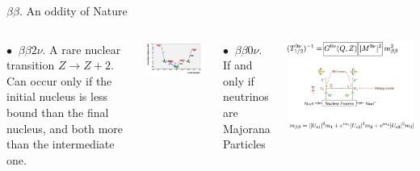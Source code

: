 \documentclass [aspectratio=169]{beamer}
\begin{document}
\begin{frame}{$\beta\beta$. An oddity of Nature}

\begin{columns}

%

$\bullet~$   $\beta\beta2\nu$. A rare nuclear transition $Z \rightarrow Z + 2$. Can occur only if the initial nucleus is less bound than the final nucleus, and both more than the intermediate one.

\includegraphics[scale=0.40]{xebb2nu.png}


$\bullet~$   $\beta\beta0\nu$. If and only if neutrinos are Majorana Particles

 \includegraphics[scale=0.22]{bb0nu.png}
%
%
 
\end{columns}
\end{frame}
\end{document}
